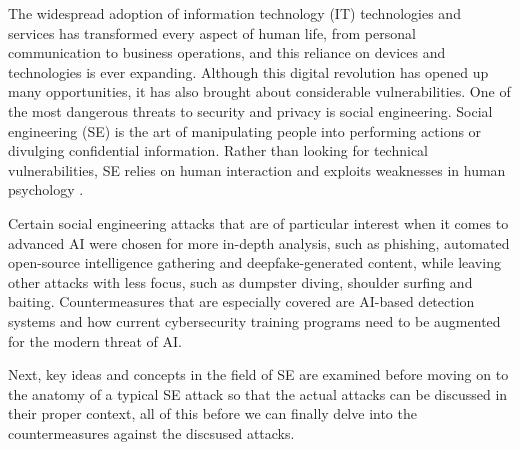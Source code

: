 \begin{comment}
    - Johdannon pituus määräytyy suhteessa koko kirjoitelman pituuteen. Parisivuinen kirjoitus ei erikseen otsikoitua johdantoa kaipaa, sillä se itsessään on laajennettu tiivistelmä. Kymmensivuisen kirjoituksen johdanto voi olla vaikkapa sivun tai puolentoista mittainen. Pro gradu -tutkielman 50-70-sivuiseen kokonaisuuteen tuntuu 2-4-sivuinen johdanto kohtuulliselta.

    - Johdanto kertoo siis lyhyessä, yleistajuisessa muodossa koko kirjoitelman kysymyksenasettelun, juonen sekä tulokset ja johtopäätelmät. Tämän luettuaan lukija voi päätellä, haluaako syventyä asiaan tarkemmin lukemalla koko kirjoituksen.

\end{comment}

The widespread adoption of information technology (IT) technologies and services has transformed every aspect of human life, from personal communication to business operations, and this reliance on devices and technologies is ever expanding. Although this digital revolution has opened up many opportunities, it has also brought about considerable vulnerabilities. One of the most dangerous threats to security and privacy is social engineering. Social engineering (SE) is the art of manipulating people into performing actions or divulging confidential information. Rather than looking for technical vulnerabilities, SE relies on human interaction and exploits weaknesses in human psychology \citep{wang_defining_2020}.

Certain social engineering attacks that are of particular interest when it comes to advanced AI were chosen for more in-depth analysis, such as phishing, automated open-source intelligence gathering and deepfake-generated content, while leaving other attacks with less focus, such as dumpster diving, shoulder surfing and baiting. Countermeasures that are especially covered are AI-based detection systems and how current cybersecurity training programs need to be augmented for the modern threat of AI.

Next, key ideas and concepts in the field of SE are examined before moving on to the anatomy of a typical SE attack so that the actual attacks can be discussed in their proper context, all of this before we can finally delve into the countermeasures against the discsused attacks.



